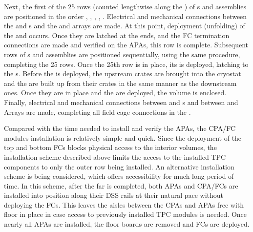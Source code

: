 Next, the first of the 25 rows (counted lengthwise along the ) of s and  assemblies are positioned in the order , , , , .  Electrical and mechanical connections between the  and s and the  and  arrays are made.  At this point, deployment (unfolding) of the  and  %
occurs.  Once they %
are latched at the  ends, and the FC termination connections are made and verified on the APAs, this  row is complete.  Subsequent rows of s and  assemblies are positioned sequentially, using the same procedure, completing the 25 rows. %
Once the 25th row is in place, its  %
is deployed, latching to the s.  Before the  is deployed, the upstream  crates are brought into the cryostat 
and the  are built up from their crates in the same manner as the downstream ones. %
Once they %
are in place and the  are deployed, the  volume is enclosed. %
Finally, electrical and mechanical connections between  and s and between  and  Arrays are made, completing all field cage connections in the .

Compared with the time needed to install and verify the APAs, the CPA/FC modules installation is relatively simple and quick.  Since the deployment of the top and bottom FCs blocks physical access to the interior volumes, the installation scheme described above limits the access to the installed TPC components to only the outer row being installed.  An alternative installation scheme is being considered, which offers accessibility for much long period of time.  In this scheme, after the far  is completed, both APAs and CPA/FCs are installed into position along their DSS rails at their natural pace without deploying the FCs. This leaves the aisles between the CPAs and APAs free with floor in place in case access to previously installed TPC modules is needed.  Once nearly all APAs are installed, the floor boards are removed and FCs are deployed.   




